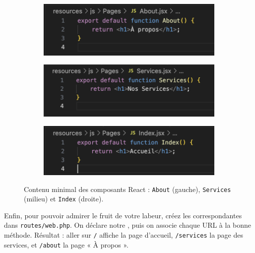 \begin{figure}[H]
    \centering
    \begin{subfigure}[b]{0.31\textwidth}
        \centering
        \includegraphics[width=\textwidth]{figures-C1/about_ini.png}
    \end{subfigure}
    \begin{subfigure}[b]{0.31\textwidth}
        \centering
        \includegraphics[width=\textwidth]{figures-C1/services_ini.png}
    \end{subfigure}
    \begin{subfigure}[b]{0.31\textwidth}
        \centering
        \includegraphics[width=\textwidth]{figures-C1/index_ini.png}
    \end{subfigure}
    \caption{Contenu minimal des composants React : \texttt{About} (gauche), \texttt{Services} (milieu) et \texttt{Index} (droite).}
\end{figure}

Enfin, pour pouvoir admirer le fruit de votre labeur, créez les \routes{} correspondantes dans \verb|routes/web.php|.  
On déclare notre \controller{}, puis on associe chaque URL à la bonne méthode. Résultat : aller sur \verb|/| affiche la page d’accueil, \verb|/services| la page des services, et \verb|/about| la page « À propos ».

